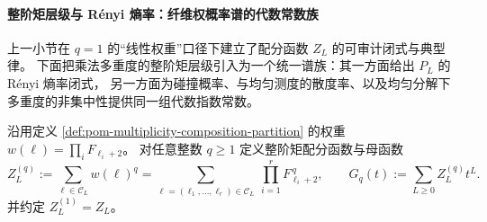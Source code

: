 \paragraph{整阶矩层级与 Rényi 熵率：纤维权概率谱的代数常数族}
上一小节在 \(q=1\) 的“线性权重”口径下建立了配分函数 \(Z_L\) 的可审计闭式与典型律。
下面把乘法多重度的整阶矩层级引入为一个统一谱族：其一方面给出 \(P_L\) 的 Rényi 熵率闭式，
另一方面为碰撞概率、与均匀测度的散度率、以及均匀分解下多重度的非集中性提供同一组代数指数常数。

\begin{definition}[整阶矩配分函数与增长常数]\label{def:pom-multiplicity-composition-integer-moment-partition}
沿用定义 \ref{def:pom-multiplicity-composition-partition} 的权重 \(w(\boldsymbol{\ell})=\prod_i F_{\ell_i+2}\)。
对任意整数 \(q\ge 1\) 定义整阶矩配分函数与母函数
\[
Z_L^{(q)}
:=\sum_{\boldsymbol{\ell}\in\mathcal{C}_L} w(\boldsymbol{\ell})^{q}
=\sum_{\boldsymbol{\ell}=(\ell_1,\dots,\ell_r)\in\mathcal{C}_L}\ \prod_{i=1}^{r}F_{\ell_i+2}^{\,q},
\qquad
G_q(t):=\sum_{L\ge 0} Z_L^{(q)}t^L.
\]
并约定 \(Z_L^{(1)}=Z_L\)。
\end{definition}


